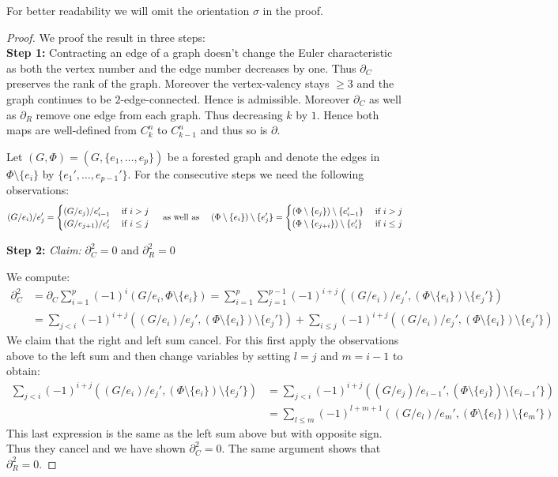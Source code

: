 For better readability we will omit the orientation $\sigma$ in the proof.
\begin{proof}


	We proof the result in three steps:\\
	\textbf{Step 1:} Contracting an edge of a graph doesn't change the Euler characteristic as both the vertex number and the edge number decreases by one.
	Thus $\partial_{C}$ preserves the rank of the graph. Moreover the vertex-valency stays $\geq 3$ and the graph continues to be $2$-edge-connected.
	Hence is admissible.
	Moreover $\partial_{C}$ as well as $\partial_{R}$ remove one edge from each graph. Thus decreasing
	$k$ by $1$. Hence both maps are well-defined from $C^{n}_{k}$ to $C^{n}_{k-1}$ and thus so is $\partial$.

	Let $(G,\Phi) = (G, \{e_1,\ldots,e_{p}\})$ be a forested graph and denote the edges in $\Phi \setminus \{e_{i}\}$ by $\{e_1',\ldots,e_{p-1}'\}$.
	For the consecutive steps we need the following observations:
	\[
		(G / e_{i}) /  e_{j}' = \begin{cases}
			(G / e_{j}) / e_{i-1}' & \text{ if } i > j\\
			(G / e_{j+1}) / e_{i}' & \text{ if } i \leq j
		\end{cases}
		\qq{ as well as }
		(\Phi \setminus \{e_{i}\}) \setminus \{e_{j}'\}  = \begin{cases}	
			(\Phi \setminus \{e_{j}\}) \setminus \{e_{i-1}'\} & \text{ if } i > j\\
			(\Phi \setminus \{e_{j+i}\}) \setminus \{e_{i}'\} & \text{ if } i \leq j
		\end{cases}
	\]

	\textbf{Step 2:}\enskip
	\emph{Claim:}
		$\partial_{C}^2 = 0$ and $\partial_{R}^2 = 0$

	We compute:
	\begin{align*}
		\partial_{C}^2 &= \partial_{C} \sum_{i=1}^{p} (-1)^{i}(G / e_{i}, \Phi \setminus \{e_{i}\})
		=  \sum_{i=1}^{p} \sum_{j=1}^{p-1} (-1)^{i+j}((G / e_{i}) / e_{j}', (\Phi \setminus \{e_{i}\} ) \setminus \{e_{j}'\})  \\
					   &= \sum_{j < i} (-1)^{i+j} ((G / e_{i}) / e_{j}', (\Phi \setminus \{e_{i}\} ) \setminus \{e_{j}'\}) + \sum_{i \leq j} (-1)^{i+j}
					   ((G / e_{i}) / e_{j}', (\Phi \setminus \{e_{i}\} ) \setminus \{e_{j}'\}) 
	\end{align*}
	We claim that the right and left sum cancel. For this first apply the observations above to the left sum and then change variables by setting $l = j$ and  $m = i-1$ to obtain:
	\begin{align*}
		\sum_{j < i} (-1)^{i+j} ((G / e_{i}) / e_{j}', (\Phi \setminus \{e_{i}\}) \setminus \{e_{j}'\} ) &= 
		\sum_{j < i} (-1)^{i+j}((G / e_{j}) / e_{i-1}', (\Phi \setminus \{e_{j}\}) \setminus \{e_{i-1}'\} ) \\ 
		&= \sum_{l \leq m} (-1)^{l+m+1} ((G / e_{l}) / e_{m}', (\Phi \setminus \{e_{l}\}) \setminus \{e_{m}'\} ) 
	\end{align*}
	This last expression is the same as the left sum above but with opposite sign. Thus they cancel and we have shown $\partial_{C}^2 = 0$.
	The same argument shows that $\partial_{R}^2 = 0$.


\end{proof}
